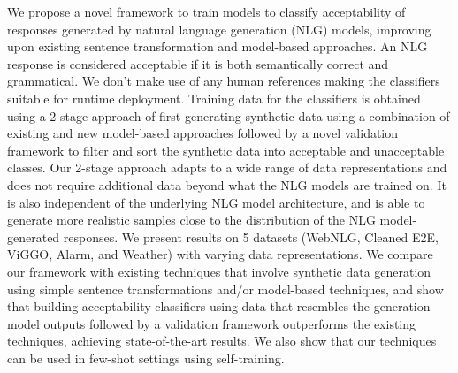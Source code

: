 We propose a novel framework to train models to classify acceptability of responses generated by natural language generation (NLG) models, improving upon existing sentence transformation and model-based approaches. An NLG response is considered acceptable if it is both semantically correct and grammatical. We don't make use of any human references making the classifiers suitable for runtime deployment. Training data for the classifiers is obtained using a 2-stage approach of first generating synthetic data using a combination of existing and new model-based approaches followed by a novel validation framework to filter and sort the synthetic data into acceptable and unacceptable classes. Our 2-stage approach adapts to a wide range of data representations and does not require additional data beyond what the NLG models are trained on. It is also independent of the underlying NLG model architecture, and is able to generate more realistic samples close to the distribution of the NLG model-generated responses. We present results on 5 datasets (WebNLG, Cleaned E2E, ViGGO, Alarm, and Weather) with varying data representations. We compare our framework with existing techniques that involve synthetic data generation using simple sentence transformations and/or model-based techniques, and show that building acceptability classifiers using data that resembles the generation model outputs followed by a validation framework outperforms the existing techniques, achieving state-of-the-art results. We also show that our techniques can be used in few-shot settings using self-training.
